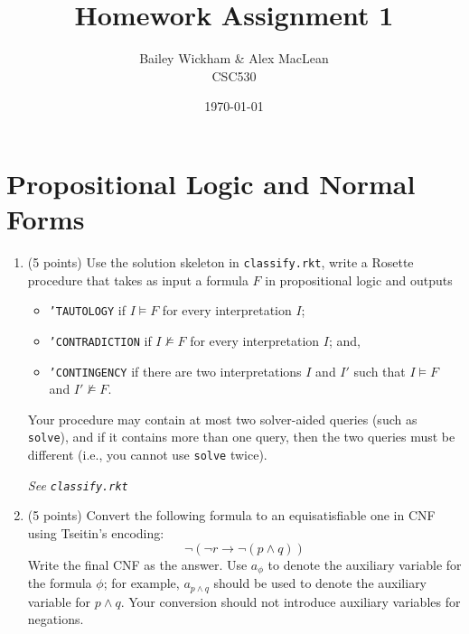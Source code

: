 \documentclass{article}
\title{Homework Assignment 1}
\author{Bailey Wickham \& Alex MacLean\\ CSC530}
\date\today
\newenvironment{solution}{\color{blue} \em }{}
\begin{document}
\maketitle

\section{Propositional Logic and Normal Forms}


\begin{enumerate}
\item (5 points) \label{prob:classify} Use the solution skeleton in \texttt{classify.rkt}, 
write a Rosette procedure that takes as input a formula $F$ in propositional logic and outputs
\begin{itemize}
	\item \texttt{'TAUTOLOGY} if $I \models F$ for every interpretation $I$;
	\item \texttt{'CONTRADICTION} if $I \not\models F$ for every interpretation $I$; and, 
	\item \texttt{'CONTINGENCY} if there are two interpretations $I$ and $I'$ such that $I\models F$ and $I'\not\models F$.
\end{itemize}
Your procedure may contain at most two solver-aided queries (such as \texttt{solve}), 
	and if it contains more than one query, then the two queries must be different (i.e., you cannot use \texttt{solve} twice).

\begin{solution}
	See \texttt{classify.rkt}
\end{solution}

\item (5 points)  Convert the following formula to an equisatisfiable one in CNF using Tseitin's encoding:
\[\neg ( \neg r \rightarrow \neg (p \land q))\]
Write the final CNF as the answer.
Use $a_\phi$ to denote the auxiliary variable for the formula $\phi$;
for example, $a_{p\wedge q}$ should be used to denote the auxiliary variable for $p\wedge q$.
Your conversion should not introduce auxiliary variables for negations.

\begin{solution}


\end{solution}
\end{enumerate}
\end{document}
